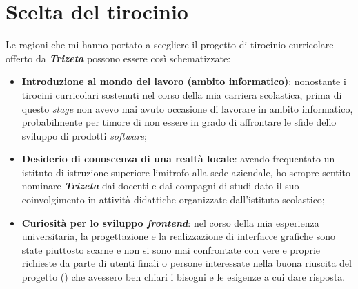 \section{Scelta del tirocinio}
Le ragioni che mi hanno portato a scegliere il progetto di tirocinio curricolare offerto da \textit{\textbf{Trizeta}} possono essere così schematizzate:
\begin{itemize}
    \item \textbf{Introduzione al mondo del lavoro (ambito informatico)}: nonostante i tirocini curricolari sostenuti nel corso della mia carriera scolastica, prima di questo \textit{stage} non avevo mai avuto occasione di lavorare in ambito informatico, 
            probabilmente per timore di non essere in grado di affrontare le sfide dello sviluppo di prodotti \textit{software};
    \item \textbf{Desiderio di conoscenza di una realtà locale}: avendo frequentato un istituto di istruzione superiore limitrofo alla sede aziendale, ho sempre sentito nominare \textit{\textbf{Trizeta}} dai docenti e dai compagni di studi dato il suo 
        coinvolgimento in attività didattiche organizzate dall'istituto scolastico;
    \item \textbf{Curiosità per lo sviluppo \textit{frontend}}: nel corso della mia esperienza universitaria, la progettazione e la realizzazione di interfacce grafiche sono state piuttosto scarne e non si sono mai confrontate con vere e proprie
        richieste da parte di utenti finali o persone interessate nella buona riuscita del progetto () che avessero ben chiari i bisogni e le esigenze a cui dare risposta.
\end{itemize}

